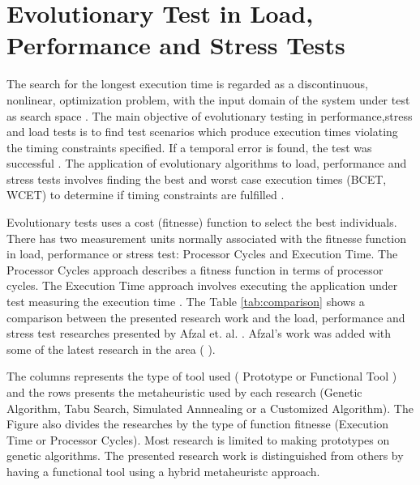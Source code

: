 \section{Evolutionary Test in Load, Performance and Stress Tests}

The search for the longest execution time is regarded as a discontinuous, nonlinear, optimization problem, with the input domain of the system under test as search space \cite{Sullivan}. The main objective of evolutionary testing in performance,stress and load tests is to find test scenarios which produce execution times violating the timing constraints specified. If a temporal error is found, the test was successful \cite{Sullivan}. The application of evolutionary algorithms to load, performance and stress tests involves finding the best and worst case execution times (BCET, WCET) to determine if timing constraints are fulfilled \cite{Afzal2009a}. 

Evolutionary tests uses a cost (fitnesse) function to select the best individuals. There has two measurement units normally associated with the fitnesse function in load, performance or stress test: Processor Cycles and Execution Time. The Processor Cycles approach describes a fitness function in terms of processor cycles. The Execution Time approach involves executing the application under test measuring the execution time \cite{Afzal2009} \cite{tracey2000search}.
%
%
The Table \ref{tab:comparison}  shows a comparison between the presented research work and the load, performance and stress test researches presented by Afzal et. al. \cite{Afzal2009}. Afzal's work was added with some of the latest research in the area (\cite{Garousi2006} \cite{Garousi2010} \cite{Alesio2015}). 


The columns represents the type of tool used ( Prototype or Functional Tool )  and the rows presents the metaheuristic used by each research (Genetic Algorithm, Tabu Search, Simulated Annnealing or a Customized Algorithm). The Figure also divides the researches by the type of function fitnesse (Execution Time or Processor Cycles). Most research is limited to making prototypes on genetic algorithms. The presented research work is distinguished from others by having a functional tool using a hybrid metaheuristc approach. 

%
%


